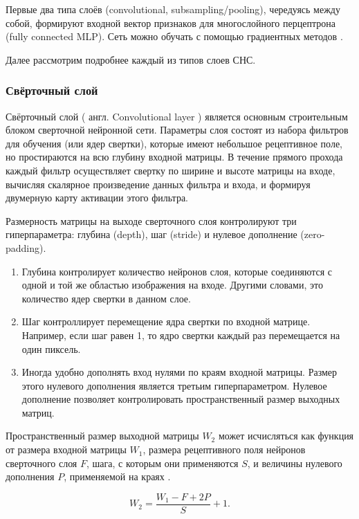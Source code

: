 \documentclass[14pt]{article}
\numberwithin{figure}{section}
\numberwithin{equation}{section}
\begin{document}
Первые два типа слоёв (convolutional, subsampling/pooling), чередуясь между собой, формируют входной вектор признаков для многослойного перцептрона (fully connected MLP). Сеть можно обучать с помощью градиентных методов \cite{Borisov2}.

Далее рассмотрим подробнее каждый из типов слоев СНС.

\subsubsection{Свёрточный слой}

Свёрточный слой ( англ. Convolutional layer ) является основным строительным блоком сверточной нейронной сети. Параметры слоя состоят из набора фильтров для обучения (или ядер свертки), которые имеют небольшое рецептивное поле, но простираются на всю глубину входной матрицы. В течение прямого прохода каждый фильтр осуществляет свертку по ширине и высоте матрицы на входе, вычисляя скалярное произведение данных фильтра и входа, и формируя двумерную карту активации этого фильтра.

Размерность матрицы на выходе сверточного слоя контролируют три гиперпараметра: глубина (depth), шаг (stride) и нулевое дополнение (zero-padding).

\begin{enumerate}
	\item
	Глубина контролирует количество нейронов слоя, которые соединяются с одной и той же областью изображения на входе. Другими словами, это количество ядер свертки в данном слое.
	\item
	Шаг контроллирует перемещение ядра свертки по входной матрице. Например, если шаг равен 1, то ядро свертки каждый раз перемещается на один пиксель.
	\item
	Иногда удобно дополнять вход нулями по краям входной матрицы. Размер этого нулевого дополнения является третьим гиперпараметром. Нулевое дополнение позволяет контролировать пространственный размер выходных матриц.
\end{enumerate}

Пространственный размер выходной матрицы $W_2$ может исчисляться как функция от размера входной матрицы $W_1$, размера рецептивного поля нейронов сверточного слоя $F$, шага, с которым они применяются $S$, и величины нулевого дополнения $P$, применяемой на краях \cite{Stanford}.

\begin{equation}
	W_2 = \frac{W_1 - F + 2P}{S} + 1.
\end{equation}
\end{document}

